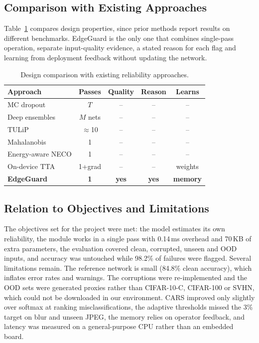 \documentclass[conference]{IEEEtran}
\begin{document}
\subsection{Comparison with Existing Approaches}

Table~\ref{tab:compare} compares design properties, since prior methods report results on different benchmarks. EdgeGuard is the only one that combines single-pass operation, separate input-quality evidence, a stated reason for each flag and learning from deployment feedback without updating the network.

\begin{table}[t]
\centering
\caption{Design comparison with existing reliability approaches.}
\label{tab:compare}
\small
\setlength{\tabcolsep}{3pt}
\begin{tabular}{lcccc}
\toprule
Approach & Passes & Quality & Reason & Learns \\
\midrule
MC dropout \cite{gal2016dropout} & $T$ & -- & -- & -- \\
Deep ensembles \cite{lakshminarayanan2017ensembles} & $M$ nets & -- & -- & -- \\
TULiP \cite{zhang2025tulip} & $\approx$10 & -- & -- & -- \\
Mahalanobis \cite{lee2018mahalanobis} & 1 & -- & -- & -- \\
Energy-aware NECO \cite{zhang2026neco} & 1 & -- & -- & -- \\
On-device TTA \cite{danilowski2026botta} & 1+grad & -- & -- & weights \\
\textbf{EdgeGuard} & \textbf{1} & \textbf{yes} & \textbf{yes} & \textbf{memory} \\
\bottomrule
\end{tabular}
\end{table}

\subsection{Relation to Objectives and Limitations}

The objectives set for the project were met: the model estimates its own reliability, the module works in a single pass with 0.14\,ms overhead and 70\,KB of extra parameters, the evaluation covered clean, corrupted, unseen and OOD inputs, and accuracy was untouched while 98.2\% of failures were flagged. Several limitations remain. The reference network is small (84.8\% clean accuracy), which inflates error rates and warnings. The corruptions were re-implemented and the OOD sets were generated proxies rather than CIFAR-10-C, CIFAR-100 or SVHN, which could not be downloaded in our environment. CARS improved only slightly over softmax at ranking misclassifications, the adaptive thresholds missed the 3\% target on blur and unseen JPEG, the memory relies on operator feedback, and latency was measured on a general-purpose CPU rather than an embedded board.
\end{document}
